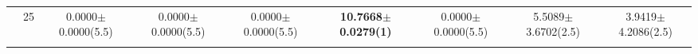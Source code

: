 \begin{table*}[htbp]
\begin{adjustbox}{width=1.0\textwidth,center}
\begin{tabular}{ccccccccc}
      & 25         & 0.0000$\pm$0.0000(5.5) & 0.0000$\pm$0.0000(5.5)          & 0.0000$\pm$0.0000(5.5) & \textbf{10.7668$\pm$0.0279(1)}   & 0.0000$\pm$0.0000(5.5)          & 5.5089$\pm$3.6702(2.5)          & 3.9419$\pm$4.2086(2.5)          \\\thickhline

\end{tabular}
\end{adjustbox}
\end{table*}
